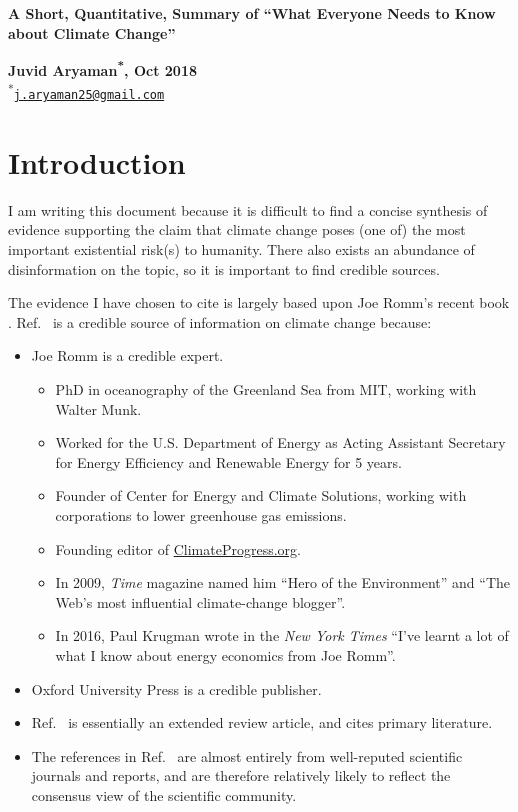 \documentclass[11pt]{article}
\begin{document}
\newcommand{\cotwo}{CO\textsubscript{2}}
\newcommand{\meth}{CH\textsubscript{4}}

\begin{flushleft}
\textsf{\textbf{\large{A Short, Quantitative, Summary of ``What Everyone Needs to Know about Climate Change''}}}
\end{flushleft}

\begin{flushleft}
\textsf{\textbf{Juvid Aryaman\textsuperscript{*}, Oct 2018}}\\
\medskip
\textsuperscript{*}{\href{mailto:j.aryaman25@gmail.com}{\nolinkurl{j.aryaman25@gmail.com}}}
\end{flushleft}

\section{Introduction}



I am writing this document because it is difficult to find a concise synthesis of evidence supporting the claim that climate change poses (one of) the most important existential risk(s) to humanity. There also exists an abundance of disinformation on the topic, so it is important to find credible sources.

The evidence I have chosen to cite is largely based upon Joe Romm's recent book \cite{Romm18}. Ref.~\cite{Romm18} is a credible source of information on climate change because:
\begin{itemize}
\item Joe Romm is a credible expert.
\begin{itemize}
\item PhD in oceanography of the Greenland Sea from MIT, working with Walter Munk.
\item Worked for the U.S. Department of Energy as Acting Assistant Secretary for Energy Efficiency and Renewable Energy for 5 years.
\item Founder of Center for Energy and Climate Solutions, working with corporations to lower greenhouse gas emissions.
\item Founding editor of \url{ClimateProgress.org}.
\item In 2009, \textit{Time} magazine named him ``Hero of the Environment'' and ``The Web's most influential climate-change blogger''.
\item In 2016, Paul Krugman wrote in the \textit{New York Times} ``I've learnt a lot of what I know about energy economics from Joe Romm''.
\end{itemize}
\item Oxford University Press is a credible publisher.
\item Ref.~\cite{Romm18} is essentially an extended review article, and cites primary literature.
\item The references in Ref.~\cite{Romm18} are almost entirely from well-reputed scientific journals and reports, and are therefore relatively likely to reflect the consensus view of the scientific community.
\end{itemize}
\end{document}
